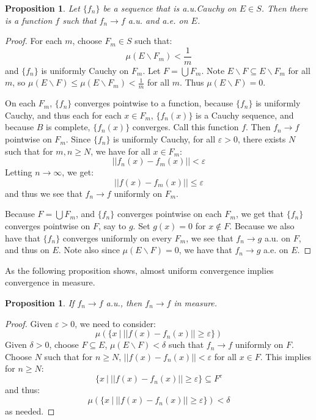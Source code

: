 \documentclass[a4paper,12pt]{report}
\newcommand{\varep}{ \varepsilon }
\newcommand{\sse} {\subseteq}
\newtheorem{prop}[theorem]{Proposition}
\begin{document}
	\begin{prop}
	Let $\{f_n\}$ be a sequence that is a.u.Cauchy on $E \in S$. Then there is a function $f$ such that $f_n \rightarrow f$ a.u. and a.e. on $E$.
	\end{prop}
	\begin{proof}
	For each $m$, choose $F_m \in S$ such that:
	\[ \mu(E \backslash F_m) < \frac{1}{m} \]
	and $\{f_n\}$ is uniformly Cauchy on $F_m$. Let $F = \bigcup F_m$. Note $E \backslash F \sse E \backslash F_m$ for all $m$, so $\mu(E \backslash F) \leq \mu(E \backslash F_m) < \frac{1}{m}$ for all $m$. Thus $\mu(E \backslash F) = 0$. 
	
	On each $F_m$, $\{f_n\}$ converges pointwise to a function, because $\{f_n\}$ is uniformly Cauchy, and thus each for each $x \in F_m$, $\{f_n(x)\}$ is a Cauchy sequence, and because $B$ is complete, $\{f_n(x)\}$ converges. Call this function $f$. Then $f_n \rightarrow f$ pointwise on $F_m$. Since $\{f_n\}$ is uniformly Cauchy, for all $\varep > 0$, there exists $N$ such that for $m, n \geq N$, we have for all $x \in F_m$:
	\[ ||f_n(x) - f_m(x)|| < \varep \]
	Letting $n \rightarrow \infty$, we get:
	\[ ||f(x) - f_m(x)|| \leq \varep \]
	and thus we see that $f_n \rightarrow f$ uniformly on $F_m$.
	
	Because $F = \bigcup F_m$, and $\{f_n\}$ converges pointwise on each $F_m$, we get that $\{f_n\}$ converges pointwise on $F$, say to $g$. Set $g(x) = 0$ for $x \notin F$. Because we also have that $\{f_n\}$ converges uniformly on every $F_m$, we see that $f_n \rightarrow g$ a.u. on $F$, and thus on $E$. Note also since $\mu(E \backslash F) = 0$, we have that $f_n \rightarrow g$ a.e. on $E$. 
	\end{proof}
	
	\noindent As the following proposition shows, almost uniform convergence implies convergence in measure. 
	
	\begin{prop}
	If $f_n \rightarrow f$ a.u., then $f_n \rightarrow f$ in measure. 
	\end{prop}
	\begin{proof}
	Given $\varep > 0$, we need to consider:
	\[ \mu \left( \{x ~|~ ||f(x) - f_n(x)|| \geq \varep \} \right) \]
	Given $\delta > 0$, choose $F \sse E$, $\mu(E \backslash F) < \delta$ such that $f_n \rightarrow f$ uniformly on $F$. Choose $N$ such that for $n \geq N$, $||f(x) - f_n(x)|| < \varep$ for all $x \in F$. This implies for $n \geq N$:
	\[ \{ x ~|~ ||f(x) - f_n(x)|| \geq \varep \} \sse F^c \]
	and thus:
	\[ \mu \left( \{x ~|~ ||f(x) - f_n(x)|| \geq \varep \} \right) < \delta \]
	as needed.
	\end{proof}
	
\end{document}
